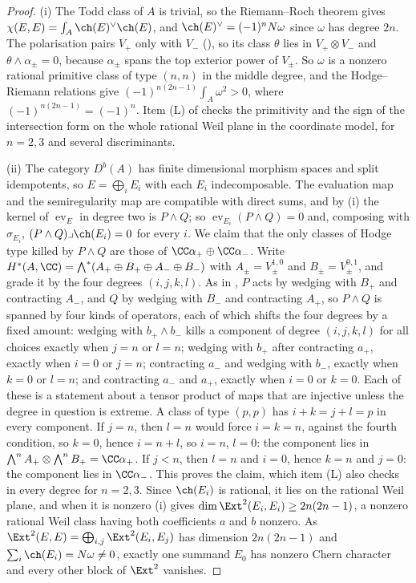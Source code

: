 \begin{proof}
(i) The Todd class of $A$ is trivial, so the Riemann--Roch theorem gives
$\chi(E,E)=\int_{A}\ch(E)^{\vee}\ch(E)$, and $\ch(E)^{\vee}=(-1)^{n}N\omega$
since $\omega$ has degree $2n$. The polarisation pairs $V_{+}$ only with
$V_{-}$ (), so its class $\theta$ lies in
$V_{+}\otimes V_{-}$ and $\theta\wedge\alpha_{\pm}=0$, because $\alpha_{\pm}$
spans the top exterior power of $V_{\pm}$. So $\omega$ is a nonzero rational
primitive class of type $(n,n)$ in the middle degree, and the Hodge--Riemann
relations give $(-1)^{n(2n-1)}\int_{A}\omega^{2}>0$, where
$(-1)^{n(2n-1)}=(-1)^{n}$. Item (L) of  checks the
primitivity and the sign of the intersection form on the whole rational Weil
plane in the coordinate model, for $n=2,3$ and several discriminants.

(ii) The category $D^{b}(A)$ has finite dimensional morphism spaces and split
idempotents, so $E=\bigoplus_{i}E_{i}$ with each $E_{i}$ indecomposable. The
evaluation map and the semiregularity map are compatible with direct sums,
and by (i) the kernel of $\operatorname{ev}_{E}$ in
degree two is $P\wedge Q$; so $\operatorname{ev}_{E_{i}}(P\wedge Q)=0$ and,
composing with $\sigma_{E_{i}}$, $(P\wedge Q)\lrcorner\ch(E_{i})=0$ for every
$i$. We claim that the only classes of Hodge type killed by $P\wedge Q$ are
those of $\CC\alpha_{+}\oplus\CC\alpha_{-}$. Write
$H^{*}(A,\CC)=\bigwedge^{*}(A_{+}\oplus B_{+}\oplus A_{-}\oplus B_{-})$ with
$A_{\pm}=V_{\pm}^{1,0}$ and $B_{\pm}=V_{\pm}^{0,1}$, and grade it by the four
degrees $(i,j,k,l)$. As in , $P$ acts by wedging with $B_{+}$
and contracting $A_{-}$, and $Q$ by wedging with $B_{-}$ and contracting
$A_{+}$, so $P\wedge Q$ is spanned by four kinds of operators, each of which
shifts the four degrees by a fixed amount: wedging with $b_{+}\wedge b_{-}$
kills a component of degree $(i,j,k,l)$ for all choices exactly when $j=n$ or
$l=n$; wedging with $b_{+}$ after contracting $a_{+}$, exactly when $i=0$ or
$j=n$; contracting $a_{-}$ and wedging with $b_{-}$, exactly when $k=0$ or
$l=n$; and contracting $a_{-}$ and $a_{+}$, exactly when $i=0$ or $k=0$. Each
of these is a statement about a tensor product of maps that are injective
unless the degree in question is extreme. A class of type $(p,p)$ has
$i+k=j+l=p$ in every component. If $j=n$, then $l=n$ would force $i=k=n$,
against the fourth condition, so $k=0$, hence $i=n+l$, so $i=n$, $l=0$: the
component lies in $\bigwedge^{n}A_{+}\otimes\bigwedge^{n}B_{+}=\CC\alpha_{+}$.
If $j<n$, then $l=n$ and $i=0$, hence $k=n$ and $j=0$: the component lies in
$\CC\alpha_{-}$. This proves the claim, which item (L) also checks in every
degree for $n=2,3$. Since $\ch(E_{i})$ is rational, it lies on the rational
Weil plane, and when it is nonzero (i) gives
$\dim\Ext^{2}(E_{i},E_{i})\ge2n(2n-1)$, a nonzero rational Weil class having
both coefficients $a$ and $b$ nonzero. As
$\Ext^{2}(E,E)=\bigoplus_{i,j}\Ext^{2}(E_{i},E_{j})$ has dimension
$2n(2n-1)$ and $\sum_{i}\ch(E_{i})=N\omega\ne0$, exactly one summand $E_{0}$
has nonzero Chern character and every other block of $\Ext^{2}$ vanishes.


\end{proof}
